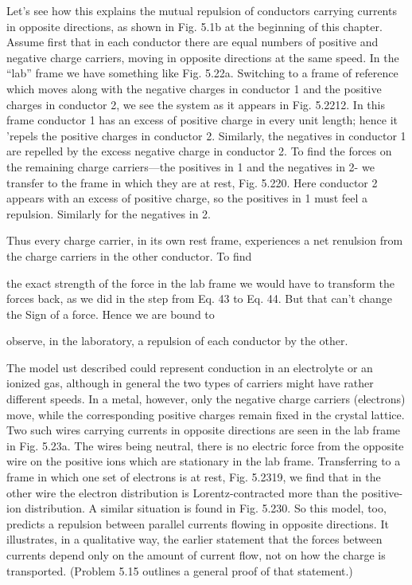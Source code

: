Let's see how this explains the mutual repulsion of conductors
carrying currents in opposite directions, as shown in Fig. 5.1b at the
beginning of this chapter. Assume first that in each conductor there
are equal numbers of positive and negative charge carriers, moving
in opposite directions at the same speed. In the ``lab'' frame we have
something like Fig. 5.22a. Switching to a frame of reference which
moves along with the negative charges in conductor 1 and the positive
charges in conductor 2, we see the system as it appears in
Fig. 5.2212. In this frame conductor 1 has an excess of positive charge
in every unit length; hence it 'repels the positive charges in conductor
2. Similarly, the negatives in conductor 1 are repelled by the
excess negative charge in conductor 2. To find the forces on the remaining
charge carriers---the positives in 1 and the negatives in 2-
we transfer to the frame in which they are at rest, Fig. 5.220. Here
conductor 2 appears with an excess of positive charge, so the positives
in 1 must feel a repulsion. Similarly for the negatives in 2.

Thus every charge carrier, in its own rest frame, experiences a net
renulsion from the charge carriers in the other conductor. To find

 
 
 

the exact strength of the force in the lab frame we would have to
transform the forces back, as we did in the step from Eq. 43 to Eq. 44.
But that can't change the Sign of a force. Hence we are bound to

observe, in the laboratory, a repulsion of each conductor by the
other.

The model ust described could represent conduction in an electrolyte
or an ionized gas, although in general the two types of carriers
might have rather different speeds. In a metal, however, only the
negative charge carriers (electrons) move, while the corresponding
positive charges remain fixed in the crystal lattice. Two such wires
carrying currents in opposite directions are seen in the lab frame in
Fig. 5.23a. The wires being neutral, there is no electric force from
the opposite wire on the positive ions which are stationary in the lab
frame. Transferring to a frame in which one set of electrons is at
rest, Fig. 5.2319, we find that in the other wire the electron distribution
is Lorentz-contracted more than the positive-ion distribution. A
similar situation is found in Fig. 5.230. So this model, too, predicts
a repulsion between parallel currents flowing in opposite directions.
It illustrates, in a qualitative way, the earlier statement that the forces
between currents depend only on the amount of current flow, not on
how the charge is transported. (Problem 5.15 outlines a general
proof of that statement.)

